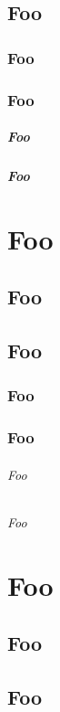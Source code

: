 \chapter{Foo}
\section{Foo}
\section{Foo}
\subsubsection{Foo}
\subsubsection{Foo}

\part{Foo}
\chapter{Foo}
\chapter{Foo}
\section{Foo}
\section{Foo}
\paragraph{Foo}
\paragraph{Foo}

\part{Foo}
\chapter{Foo}
\chapter{Foo}

